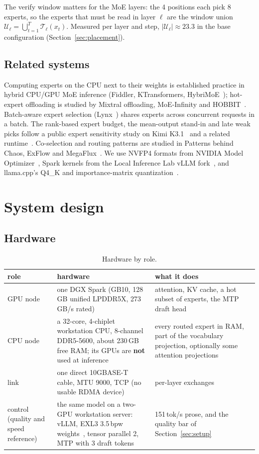 \documentclass[11pt]{article}
\newcommand{\tps}{\,tok/s}
\begin{document}
The verify window matters for the MoE layers: the 4 positions each pick 8 experts, so the experts that must be read in
layer $\ell$ are the window union $\mathcal{U}_\ell = \bigcup_{t=1}^{T} \mathcal{T}_\ell(x_t)$. Measured per layer and
step, $|\mathcal{U}_\ell| \approx 23.3$ in the base configuration (Section~\ref{sec:placement}).

\subsection{Related systems}
Computing experts on the CPU next to their weights is established practice in hybrid CPU/GPU MoE inference (Fiddler,
KTransformers, HybriMoE~\citep{fiddler,ktransformers,hybrimoe}); hot-expert offloading is studied by Mixtral offloading,
MoE-Infinity and HOBBIT~\citep{mixtraloffload,moeinfinity,hobbit}. Batch-aware expert selection (Lynx~\citep{lynx}) shares
experts across concurrent requests in a batch. The rank-based expert budget, the mean-output stand-in and late weak
picks follow a public expert sensitivity study on Kimi K3.1~\citep{k31study} and a related runtime~\citep{derpseek}.
Co-selection and routing patterns are studied in Patterns behind Chaos, ExFlow and MegaFlux~\citep{chaos,exflow,megaflux}.
We use NVFP4 formats from NVIDIA Model Optimizer~\citep{modelopt}, Spark kernels from the Local Inference Lab vLLM
fork~\citep{lil}, and llama.cpp's Q4\_K and importance-matrix quantization~\citep{llamacpp}.

\section{System design}
\label{sec:system}

\subsection{Hardware}
\label{sec:hardware}

\begin{table}[h]
\centering\small
\caption{Hardware by role.}
\label{tab:hardware}
\begin{tabularx}{\linewidth}{>{\raggedright\arraybackslash}p{2.6cm} L L}
\toprule
role & hardware & what it does \\
\midrule
GPU node & one DGX Spark (GB10, 128\,GB unified LPDDR5X, 273\,GB/s rated) & attention, KV cache, a hot subset of experts, the MTP draft head \\
CPU node & a 32-core, 4-chiplet workstation CPU, 8-channel DDR5-5600, about 230\,GB free RAM; its GPUs are \textbf{not} used at inference & every routed expert in RAM, part of the vocabulary projection, optionally some attention projections \\
link & one direct 10GBASE-T cable, MTU 9000, TCP (no usable RDMA device) & per-layer exchanges \\
control (quality and speed reference) & the same model on a two-GPU workstation server: vLLM, EXL3 3.5\,bpw weights~\citep{exllamav3}, tensor parallel 2, MTP with 3 draft tokens & 151\tps{} prose, and the quality bar of Section~\ref{sec:setup} \\
\bottomrule
\end{tabularx}
\end{table}
\end{document}

